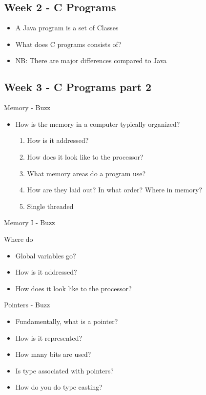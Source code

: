 
\subsection*{Week 2 - C Programs}
\begin{itemize}
\item A Java program is a set of Classes
\item What does C programs consists of?
\item NB: There are major differences compared to Java
\end{itemize}

\subsection*{Week 3 - C Programs part 2}

Memory - Buzz

\begin{itemize}
\item How is the memory in a computer typically organized?
  \begin{enumerate}
    \item How is it addressed?
    \item How does it look like to the processor?
    \item What memory areas do a program use?
    \item How are they laid out? In what order? Where in memory?
    \item Single threaded

  \end{enumerate}
\end{itemize}

Memory I - Buzz

Where do
\begin{itemize}
\item Global variables go?
\item How is it addressed?
\item How does it look like to the processor?
\end{itemize}

Pointers - Buzz

\begin{itemize}
\item Fundamentally, what is a pointer?
\item How is it represented?
\item How many bits are used?
\item Is type associated with pointers?
\item How do you do type casting?
\end{itemize}

